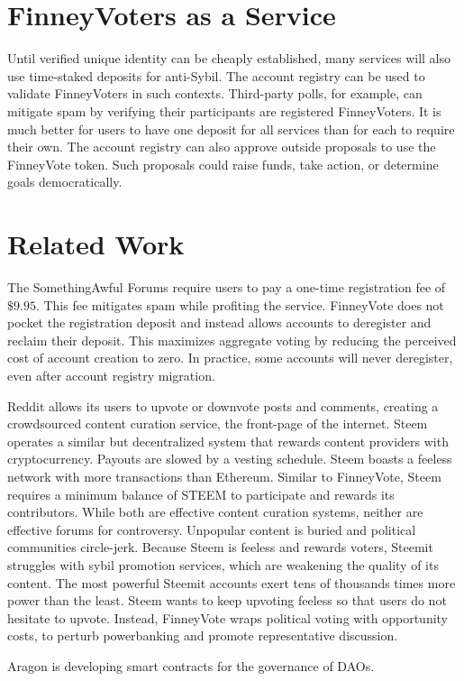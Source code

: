\documentclass{article}
\begin{document}
\section{FinneyVoters as a Service}
Until verified unique identity can be cheaply established, many services will also use time-staked deposits for anti-Sybil.
The account registry can be used to validate FinneyVoters in such contexts.
Third-party polls, for example, can mitigate spam by verifying their participants are registered FinneyVoters.
It is much better for users to have one deposit for all services than for each to require their own.
The account registry can also approve outside proposals to use the FinneyVote token.
Such proposals could raise funds, take action, or determine goals democratically.
\section{Related Work}
The SomethingAwful Forums require users to pay a one-time registration fee of $\$9.95$.
This fee mitigates spam while profiting the service.
FinneyVote does not pocket the registration deposit and instead allows accounts to deregister and reclaim their deposit.
This maximizes aggregate voting by reducing the perceived cost of account creation to zero.
In practice, some accounts will never deregister, even after account registry migration.
\par
Reddit allows its users to upvote or downvote posts and comments, creating a crowdsourced content curation service, the front-page of the internet.
Steem operates a similar but decentralized system that rewards content providers with cryptocurrency.
Payouts are slowed by a vesting schedule.
Steem boasts a feeless network with more transactions than Ethereum.
Similar to FinneyVote, Steem requires a minimum balance of STEEM to participate and rewards its contributors.
While both are effective content curation systems, neither are effective forums for controversy.
Unpopular content is buried and political communities circle-jerk.
Because Steem is feeless and rewards voters, Steemit struggles with sybil promotion services, which are weakening the quality of its content.
The most powerful Steemit accounts exert tens of thousands times more power than the least.
Steem wants to keep upvoting feeless so that users do not hesitate to upvote.
Instead, FinneyVote wraps political voting with opportunity costs, to perturb powerbanking and promote representative discussion.
\par
Aragon is developing smart contracts for the governance of DAOs.
\end{document}
